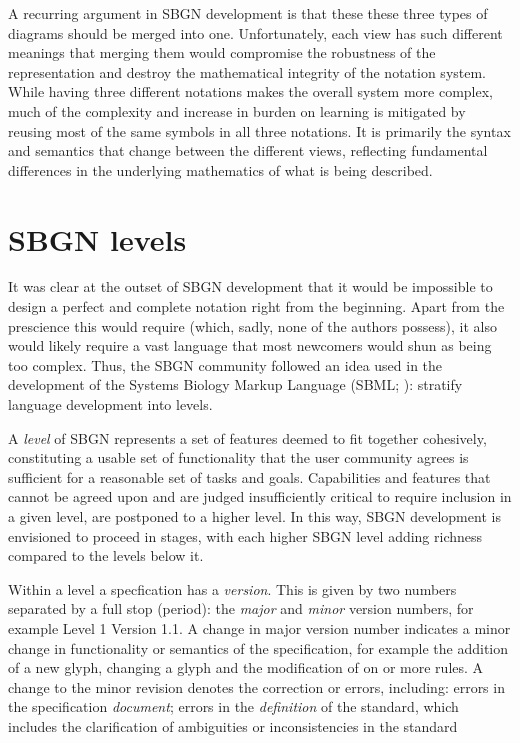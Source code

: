 A recurring argument in SBGN development is that these these three types of diagrams should be merged into one.  Unfortunately, each view has such different meanings that merging them would compromise the robustness of the representation and destroy the mathematical integrity of the notation system.  While having three different notations makes the overall system more complex, much of the complexity and increase in burden on learning is mitigated by reusing most of the same symbols in all three notations.  It is primarily the syntax and semantics that change between the different views, reflecting fundamental differences in the underlying mathematics of what is being described.

\section{SBGN levels}
\label{sec:sbgn-levels}

It was clear at the outset of SBGN development that it would be impossible to design a perfect and complete notation right from the beginning.  Apart from the prescience this would require (which, sadly, none of the authors possess), it also would likely require a vast language that most newcomers would shun as being too complex.  Thus, the SBGN community followed an idea used in the development of the Systems Biology Markup Language (SBML; \cite{Hucka:2003}): stratify language development into levels.

A \emph{level} of SBGN represents a set of features deemed to fit together cohesively, constituting a usable set of functionality that the user community agrees is sufficient for a reasonable set of tasks and goals.  Capabilities and features that cannot be agreed upon and are judged insufficiently critical to require inclusion in a given level, are postponed to a higher level.  In this way, SBGN development is envisioned to proceed in stages, with each higher SBGN level adding richness compared to the levels below it.

Within a level a specfication has a \emph{version}. This is given by two numbers separated by a full stop (period): the \emph{major} and \emph{minor} version numbers, for example Level 1 Version 1.1. A change in major version number indicates a minor change in functionality or semantics of the specification, for example the addition of a new glyph, changing a glyph and the modification of on or more rules. A change to the minor revision denotes the correction or errors, including: errors in the specification \emph{document}; errors in the \emph{definition} of the standard, which includes the clarification of ambiguities or inconsistencies in the standard

